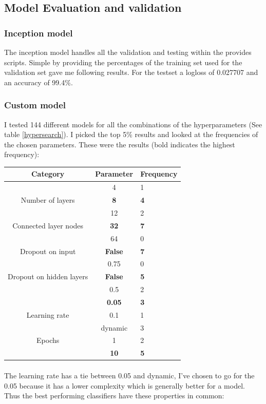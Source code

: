 \documentclass[11pt]{article}
\begin{document}
\subsection{Model Evaluation and validation}
\subsubsection{Inception model}
The inception model handles all the validation and testing within the provides scripts. Simple by providing the percentages of the training set used for the validation set gave me following results. For the testset a logloss of 0.027707 and an accuracy of 99.4\%.
\subsubsection{Custom model}
I tested 144 different models for all the combinations of the hyperparameters (See table \ref{hypersearch}). I picked the top 5\% results and looked at the frequencies of the chosen parameters. These were the results (bold indicates the highest frequency):

\begin{tabular}{ c | c | l}
 Category & Parameter & Frequency\\
 \hline
                  & 4 & 1\\
 Number of layers & \textbf{8} & \textbf{4}\\
                  & 12 & 2\\
 \hline
 Connected layer nodes & \textbf{32} & \textbf{7}\\
                       & 64 & 0\\
 \hline
 Dropout on input & \textbf{False} & \textbf{7}\\
 & 0.75 & 0\\
 \hline
 Dropout on hidden layers & \textbf{False} & \textbf{5}\\
 & 0.5 & 2\\
 \hline
 & \textbf{0.05} & \textbf{3}\\
 Learning rate & 0.1 & 1 \\
 & dynamic & 3\\
 \hline
 Epochs & 1 & 2\\
 & \textbf{10} & \textbf{5}\\
 \hline
\end{tabular}

\paragraph{} The learning rate has a tie between 0.05 and dynamic, I've chosen to go for the 0.05 because it has a lower complexity which is generally better for a model. Thus the best performing classifiers have these properties in common:\\
\end{document}
